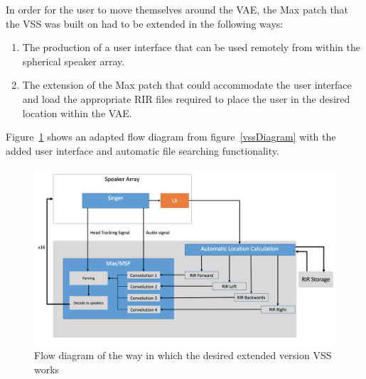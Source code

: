 \documentclass[../../main.tex]{subfiles}
\begin{document}
		In order for the user to move themselves around the \ac{VAE}, the Max patch that the \ac{VSS} was built on had to be extended in the following ways:

		\begin{enumerate}

			\item The production of a user interface that can be used remotely from within the spherical speaker array. \\

			\item The extension of the Max patch that could accommodate the user interface and load the appropriate \ac{RIR} files required to place the user in the desired location within the \ac{VAE}.

		\end{enumerate}

		Figure~\ref{vssExtention} shows an adapted flow diagram from figure~\ref{vssDiagram} with the added user interface and automatic file searching functionality.

		\begin{figure}[H]
			\centerline{\includegraphics[scale = 0.45]{Sections/Background/images/vssExtention.png}}
			\caption{Flow diagram of the way in which the desired extended version VSS works}
			\label{vssExtention}
		\end{figure}



\end{document}
